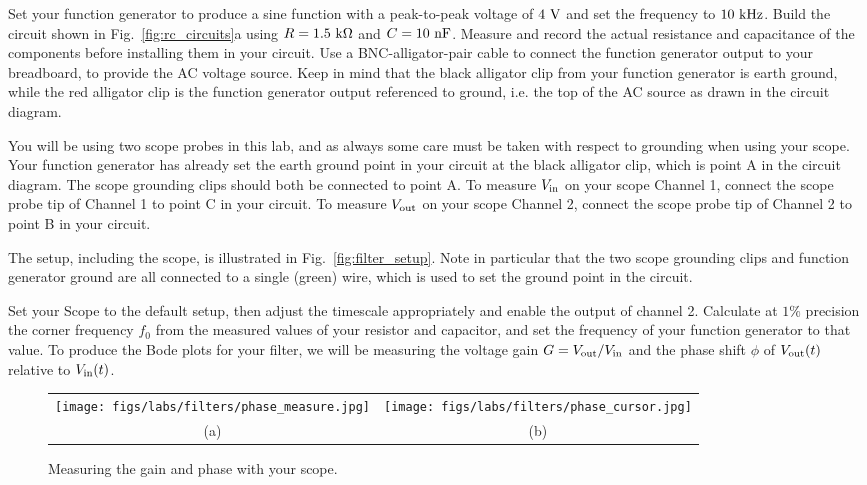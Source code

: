 Set your function generator to produce a sine function with a
peak-to-peak voltage of $4~\rm V$ and set the frequency to $10~\rm
kHz$.  Build the circuit shown in Fig.~\ref{fig:rc_circuits}a using
$R=1.5~\rm k \Omega$ and $C= 10~\rm nF$.  Measure and record the
actual resistance and capacitance of the components before installing
them in your circuit.  Use a BNC-alligator-pair cable to connect the
function generator output to your breadboard, to provide the AC
voltage source.  Keep in mind that the black alligator clip from your
function generator is earth ground, while the red alligator clip is the
function generator output referenced to ground, i.e. the top of the AC
source as drawn in the circuit diagram.

You will be using two scope probes in this lab, and as always some
care must be taken with respect to grounding when using your scope.
Your function generator has already set the earth ground point in your
circuit at the black alligator clip, which is point A in the circuit
diagram.  The scope grounding clips should both be connected to point
A.  To measure $V_{\rm in}$ on your scope Channel 1, connect the scope
probe tip of Channel 1 to point C in your circuit.  To measure $V_{\rm
  out}$ on your scope Channel 2, connect the scope probe tip of
Channel 2 to point B in your circuit.

The setup, including the scope, is illustrated in
Fig.~\ref{fig:filter_setup}.  Note in particular that the two scope
grounding clips and function generator ground are all connected to a
single (green) wire, which is used to set the ground point in the
circuit.

Set your Scope to the default setup, then adjust the timescale
appropriately and enable the output of channel 2.  Calculate at $1\%$
precision the corner frequency $f_0$ from the measured values of your
resistor and capacitor, and set the frequency of your function
generator to that value.  To produce the Bode plots for your filter,
we will be measuring the voltage gain $G = V_{\rm out} / V_{\rm in}$
and the phase shift $\phi$ of $V_{\rm out}(t)$ relative to $V_{\rm
  in}(t)$.

\begin{figure}[htbp]
\begin{center}
\begin{tabular}{cc}
\texttt{[image: figs/labs/filters/phase\_measure.jpg]} &
\texttt{[image: figs/labs/filters/phase\_cursor.jpg]} \\
(a) & (b) \\
\end{tabular}
\end{center}
\caption{\label{fig:scopegain} Measuring the gain and phase with your scope.}
\end{figure}

